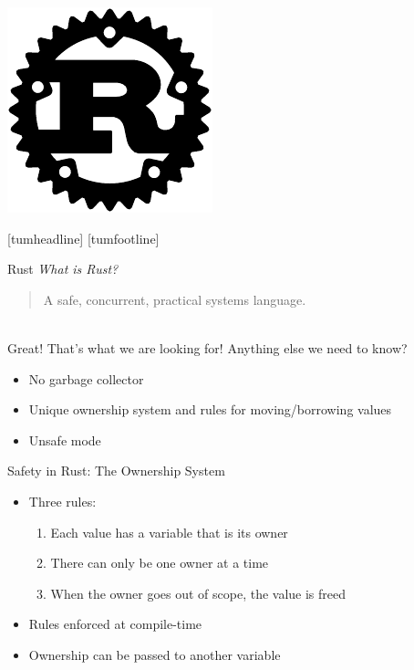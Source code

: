 \documentclass[NET,english,aspectratio=169,notitleframe]{tumbeamer}
\begin{document}
\begin{frame}{}
\centering\includegraphics[height=0.87\textheight]{pics/rust}
\end{frame}
[tumheadline]
[tumfootline]

\begin{frame}{Rust}
\emph{What is Rust?}\\
\begin{quote}
A safe, concurrent, practical systems language.
\end{quote}\\
Great! That's what we are looking for! Anything else we need to know?\\
\begin{itemize}
\item No garbage collector
\item Unique ownership system and rules for moving/borrowing values
\item Unsafe mode
\end{itemize}
\end{frame}

\begin{frame}{Safety in Rust: The Ownership System}
\begin{itemize}
\item Three rules:
\begin{enumerate}
\item Each value has a variable that is its owner
\item There can only be one owner at a time
\item When the owner goes out of scope, the value is freed
\end{enumerate}
\item Rules enforced at compile-time
\item Ownership can be passed to another variable%
\end{itemize}
\end{frame}
\end{document}
